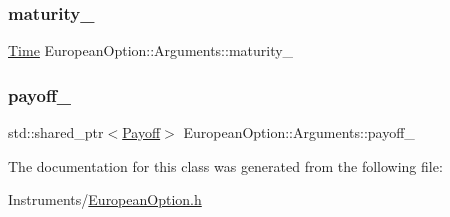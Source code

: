 \subsubsection{\texorpdfstring{maturity\+\_\+}{maturity\_}}
{\footnotesize\ttfamily \hyperlink{_name_def_8h_ac2d3e0ba793497bcca555c7c2cf64ff3}{Time} European\+Option\+::\+Arguments\+::maturity\+\_\+}

\hypertarget{class_european_option_1_1_arguments_a01a26c6641a2bb9f439c4191c5eb7d76}{}\label{class_european_option_1_1_arguments_a01a26c6641a2bb9f439c4191c5eb7d76} 
\subsubsection{\texorpdfstring{payoff\+\_\+}{payoff\_}}
{\footnotesize\ttfamily std\+::shared\+\_\+ptr$<$\hyperlink{class_payoff}{Payoff}$>$ European\+Option\+::\+Arguments\+::payoff\+\_\+}



The documentation for this class was generated from the following file\+:\begin{DoxyCompactItemize}
\item 
Instruments/\hyperlink{_european_option_8h}{European\+Option.\+h}\end{DoxyCompactItemize}
